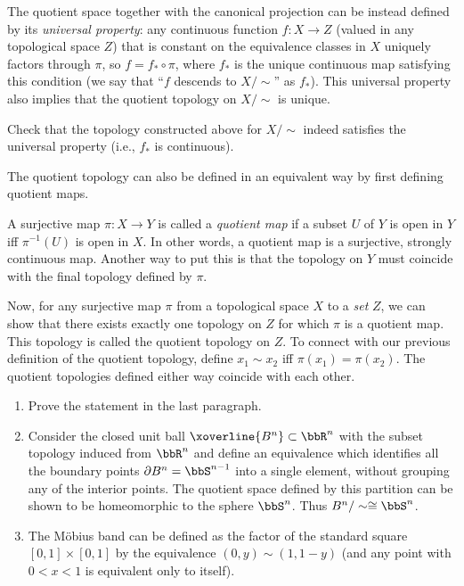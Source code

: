 The quotient space together with the canonical projection can be instead defined by its \emph{universal property}: any continuous function $f:X\to Z$ (valued in any topological space $Z$) that is constant on the equivalence classes in $X$ uniquely factors through  $\pi$, so $f=f_\ast\circ\pi$, where $f_\ast$ is the unique continuous map satisfying this condition (we say that ``$f$ descends to $X/\sim$'' as $f_\ast$). This universal property also implies that the quotient topology on $X\slash\sim$ is unique.

\begin{xca}
    Check that the topology constructed above for $X/\sim$ indeed satisfies the universal property (i.e., $f_\ast$ is continuous).
\end{xca}

The quotient topology can also be defined in an equivalent way by first defining quotient maps.
\begin{defn}
    A surjective map $\pi:X\rightarrow Y$ is called a \emph{quotient map} if a subset $U$ of $Y$ is open in $Y$ iff $\pi^{-1}(U)$ is open in $X$. In other words, a quotient map is a surjective, strongly continuous map. Another way to put this is that the topology on $Y$ must coincide with the final topology defined by $\pi$.
\end{defn}

Now, for any surjective map $\pi$ from a topological space $X$ to a \emph{set} $Z$, we can show that there exists exactly one topology on $Z$ for which $\pi$ is a quotient map. This topology is called the quotient topology on $Z$. To connect with our previous definition of the quotient topology, define $x_1\sim x_2$ iff $\pi(x_1)=\pi(x_2)$. The quotient topologies defined either way coincide with each other.

\begin{example}
\begin{enumerate}
    \item Prove the statement in the last paragraph.
    \item Consider the closed unit ball $\xoverline{B^n}\subset\bbR^n$ with the subset topology induced from $\bbR^n$ and define an equivalence which identifies all the boundary points $\partial B^n = \bbS^{n-1}$ into a single element, without grouping any of the interior points. The quotient space defined by this partition can be shown to be homeomorphic to the sphere $\bbS^n$. Thus $B^n/\sim \cong \bbS^n$.
    \item The M\"obius band can be defined as the factor of the standard square $[0,1]\times[0,1]$ by the equivalence $(0,y)\sim (1,1-y)$ (and any point with $0<x<1$ is equivalent only to itself).
\end{enumerate}
\end{example}

